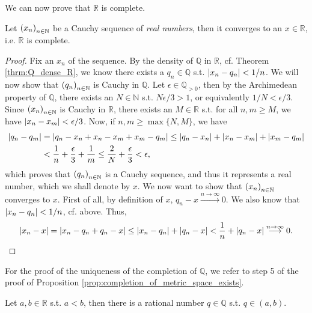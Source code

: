 We can now prove that $\mathbb R$ is complete.

\begin{proposition}\label{prop:R_is_complete}
	Let $\seq[x_n]$ be a Cauchy sequence of \textit{real numbers}, then it converges to an $x\in\mathbb R$, i.e. $\mathbb R$ is complete.
\end{proposition}

\begin{proof}
	Fix an $x_n$ of the sequence. By the density of $\mathbb Q$ in $\mathbb R$, cf. Theorem \ref{thrm:Q_dense_R}, we know there exists a $q_n\in\mathbb Q$ s.t. $\abs{x_n - q_n} < 1/n$. We will now show that $\seq[q_n]$ is Cauchy in $\mathbb Q$. Let $\epsilon\in\mathbb Q_{> 0}$, then by the Archimedean property of $\mathbb Q$, there exists an $N\in\mathbb N$ s.t. $N\epsilon/3 > 1$, or equivalently $1/N < \epsilon/3$. Since $\seq[x_n]$ is Cauchy in $\mathbb R$, there exists an $M\in\mathbb R$ s.t. for all $n, m\geq M$, we have $\abs{x_n - x_m} < \epsilon/3$. Now, if $n, m\geq \max\{N, M\}$, we have 
	\begin{align*}
		\abs{q_n - q_m} &= \abs{q_n -x_n + x_n - x_m + x_m - q_m } \leq \abs{q_n - x_n} + \abs{x_n - x_m} + \abs{x_m - q_m} 
		\\  &< \frac{1}{n} + \frac{\epsilon}{3} + \frac{1}{m} \leq \frac{2}{N} + \frac{\epsilon}{3} < \epsilon,
	\end{align*}
	which proves that $\seq[q_n]$ is a Cauchy sequence, and thus it represents a real number, which we shall denote by $x$. We now want to show that $\seq[x_n]$ converges to $x$. First of all, by definition of $x$, $q_n - x\overset{n\to\infty}{\longrightarrow} 0$. We also know that $\abs{x_n - q_n} < 1/n$, cf. above. Thus, 
	\begin{align*}
		\abs{x_n - x} = \abs{x_n - q_n + q_n - x} \leq \abs{x_n - q_n} + \abs{q_n - x} < \frac{1}{n} + \abs{q_n - x}\overset{n\to\infty}{\longrightarrow} 0.
	\end{align*}
\end{proof}

\begin{remark}
	For the proof of the uniqueness of the completion of $\mathbb Q$, we refer to step 5 of the proof of Proposition \ref{prop:completion_of_metric_space_exists}.
\end{remark}

\begin{theorem}\label{thrm:between_two_reals_rational}
	Let $a, b\in\mathbb R$ s.t. $a < b$, then there is a rational number $q\in\mathbb Q$ s.t. $q\in (a, b)$.
\end{theorem}

